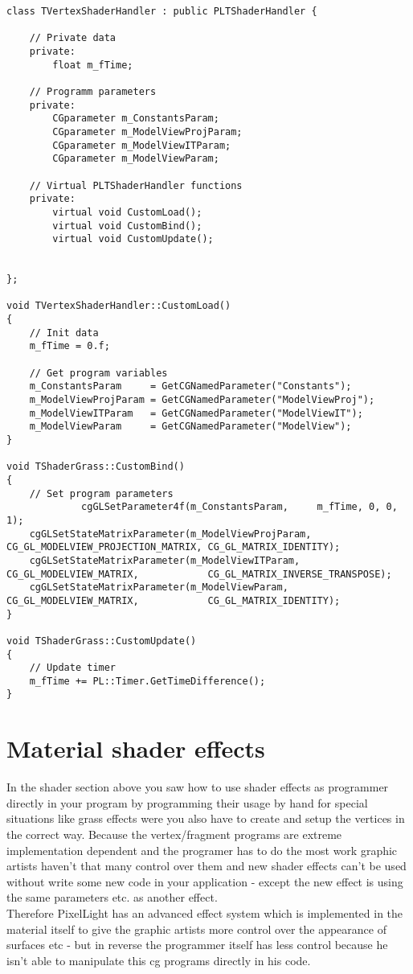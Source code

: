 \begin{lstlisting}[caption=Creating own shader handler]
class TVertexShaderHandler : public PLTShaderHandler {

	// Private data
	private:
		float m_fTime;

	// Programm parameters
	private:
		CGparameter m_ConstantsParam;
		CGparameter m_ModelViewProjParam;
		CGparameter m_ModelViewITParam;
		CGparameter m_ModelViewParam;

	// Virtual PLTShaderHandler functions
	private:
		virtual void CustomLoad();
		virtual void CustomBind();
		virtual void CustomUpdate();


};

void TVertexShaderHandler::CustomLoad()
{
    // Init data
    m_fTime = 0.f;

    // Get program variables
    m_ConstantsParam     = GetCGNamedParameter("Constants");
    m_ModelViewProjParam = GetCGNamedParameter("ModelViewProj");
    m_ModelViewITParam   = GetCGNamedParameter("ModelViewIT");
    m_ModelViewParam     = GetCGNamedParameter("ModelView");
}

void TShaderGrass::CustomBind()
{
    // Set program parameters
             cgGLSetParameter4f(m_ConstantsParam,     m_fTime, 0, 0, 1);
    cgGLSetStateMatrixParameter(m_ModelViewProjParam, CG_GL_MODELVIEW_PROJECTION_MATRIX, CG_GL_MATRIX_IDENTITY);
    cgGLSetStateMatrixParameter(m_ModelViewITParam,   CG_GL_MODELVIEW_MATRIX,            CG_GL_MATRIX_INVERSE_TRANSPOSE);
    cgGLSetStateMatrixParameter(m_ModelViewParam,     CG_GL_MODELVIEW_MATRIX,            CG_GL_MATRIX_IDENTITY);
}

void TShaderGrass::CustomUpdate()
{
    // Update timer
    m_fTime += PL::Timer.GetTimeDifference();
}
\end{lstlisting}




\section{Material shader effects}
In the shader section above you saw how to use shader effects as programmer directly in your program
by programming their usage by hand for special situations like grass effects were you also have to
create and setup the vertices in the correct way.
Because the vertex/fragment programs are extreme implementation dependent and the programer has to
do the most work graphic artists haven't that many control over them and new shader effects can't be
used without write some new code in your application - except the new effect is using the same parameters
etc. as another effect.\\
Therefore PixelLight has an advanced effect system which is implemented in the material itself to give the
graphic artists more control over the appearance of  surfaces etc - but in reverse the programmer
itself has less control because he isn't able to manipulate this cg programs directly in his code.\\




